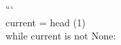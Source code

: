 \documentclass[preview]{standalone}
\begin{document}
```\\current = head (1)\\while current is not None:\\
\end{document}
